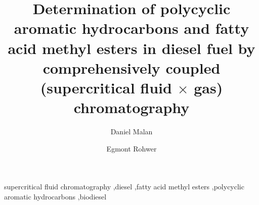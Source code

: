 \documentclass[preprint,12pt]{elsarticle}
\begin{document}
\newcommand{\oneD}{\textsuperscript{1}D\xspace}
\newcommand{\twoD}{\textsuperscript{2}D\xspace}

\begin{frontmatter}



\title{Determination of polycyclic aromatic hydrocarbons and fatty acid methyl esters in diesel fuel by comprehensively coupled (supercritical fluid \(\times\) gas) chromatography}


\author{Daniel Malan}
\address{Department of Chemistry, University of Pretoria}


\author{Egmont Rohwer}
\address{Department of Chemistry, University of Pretoria}

\begin{abstract}



\end{abstract}

\begin{keyword}
supercritical fluid chromatography \sep diesel \sep fatty acid methyl esters \sep polycyclic aromatic hydrocarbons \sep biodiesel


\end{keyword}

\end{frontmatter}
\end{document}
